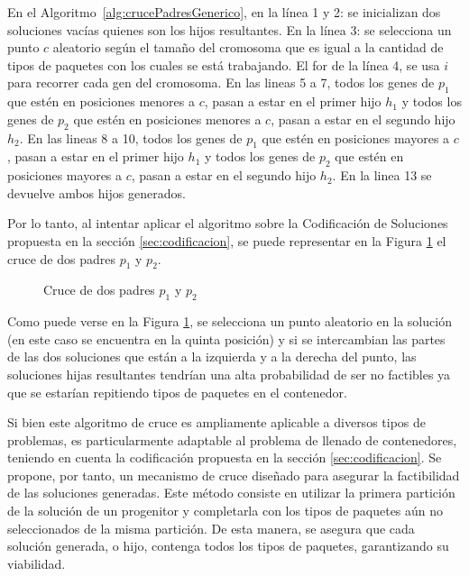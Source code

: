 \documentclass[openany]{article}
\begin{document}
En el Algoritmo~\ref{alg:crucePadresGenerico}, en la línea 1 y 2: se inicializan dos soluciones vacías quienes son los hijos resultantes. En la línea 3: se selecciona un punto $c$ aleatorio según el tamaño del cromosoma que es igual a la cantidad de tipos de paquetes con los cuales se está trabajando. El for de la línea 4, se usa $i$ para recorrer cada gen del cromosoma. En las lineas 5 a 7, todos los genes de $p_1$ que estén en posiciones menores a $c$, pasan a estar en el primer hijo $h_1$ y todos los genes de $p_2$ que estén en posiciones menores a $c$, pasan a estar en el segundo hijo $h_2$. En las lineas 8 a 10, todos los genes de $p_1$ que estén en posiciones mayores a $c$, pasan a estar en el primer hijo $h_1$ y todos los genes de $p_2$ que estén en posiciones mayores a $c$, pasan a estar en el segundo hijo $h_2$. En la linea 13 se devuelve ambos hijos generados.

Por lo tanto, al intentar aplicar el algoritmo sobre la Codificación de Soluciones propuesta en la sección \ref{sec:codificacion}, se puede representar en la Figura \ref{fig:cruce_simple} el cruce de dos padres $p_1$ y $p_2$.

\begin{figure}[H]
    \centering
    
    \caption{Cruce de dos padres $p_1$ y $p_2$}
    \label{fig:cruce_simple}
\end{figure}

Como puede verse en la Figura \ref{fig:cruce_simple}, se selecciona un punto aleatorio en la solución (en este caso se encuentra en la quinta posición) y si se intercambian las partes de las dos soluciones que están a la izquierda y a la derecha del punto, las soluciones hijas resultantes tendrían una alta probabilidad de ser no factibles ya que se estarían repitiendo tipos de paquetes en el contenedor.

Si bien este algoritmo de cruce es ampliamente aplicable a diversos tipos de problemas, es particularmente adaptable al problema de llenado de contenedores, teniendo en cuenta la codificación propuesta en la sección \ref{sec:codificacion}. Se propone, por tanto, un mecanismo de cruce diseñado para asegurar la factibilidad de las soluciones generadas. Este método consiste en utilizar la primera partición de la solución de un progenitor y completarla con los tipos de paquetes aún no seleccionados de la misma partición. De esta manera, se asegura que cada solución generada, o hijo, contenga todos los tipos de paquetes, garantizando su viabilidad.
\end{document}
